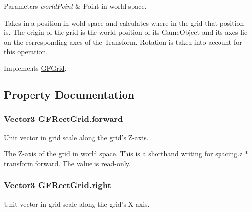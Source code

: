 \begin{DoxyParams}{Parameters}
{\em world\+Point} & Point in world space.\\
\hline
\end{DoxyParams}


Takes in a position in wold space and calculates where in the grid that position is. The origin of the grid is the world position of its Game\+Object and its axes lie on the corresponding axes of the Transform. Rotation is taken into account for this operation. 

Implements \hyperlink{class_g_f_grid_a3c424ac71404a8c87a958b5b5952eb0f_a3c424ac71404a8c87a958b5b5952eb0f}{G\+F\+Grid}.



\subsection{Property Documentation}
\hypertarget{class_g_f_rect_grid_a64e371af00fca22f78362473730d4919_a64e371af00fca22f78362473730d4919}{
\subsubsection[{forward}]{\setlength{\rightskip}{0pt plus 5cm}Vector3 G\+F\+Rect\+Grid.\+forward\hspace{0.3cm}{\ttfamily [get]}}}\label{class_g_f_rect_grid_a64e371af00fca22f78362473730d4919_a64e371af00fca22f78362473730d4919}
Unit vector in grid scale along the grid's Z-\/axis.

The Z-\/axis of the grid in world space. This is a shorthand writing for {\ttfamily spacing.\+z $\ast$ transform.\+forward}. The value is read-\/only. \hypertarget{class_g_f_rect_grid_acaaffd9ca33010bfb39b1b032b283d81_acaaffd9ca33010bfb39b1b032b283d81}{
\subsubsection[{right}]{\setlength{\rightskip}{0pt plus 5cm}Vector3 G\+F\+Rect\+Grid.\+right\hspace{0.3cm}{\ttfamily [get]}}}\label{class_g_f_rect_grid_acaaffd9ca33010bfb39b1b032b283d81_acaaffd9ca33010bfb39b1b032b283d81}
Unit vector in grid scale along the grid's X-\/axis.


